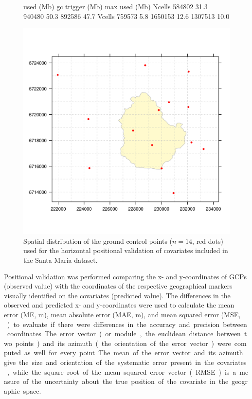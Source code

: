 \begin{figure}[!ht]
\centering
\begin{Schunk}
\begin{Soutput}
         used (Mb) gc trigger (Mb) max used (Mb)
Ncells 584802 31.3     940480 50.3   892586 47.7
Vcells 759573  5.8    1650153 12.6  1307513 10.0
\end{Soutput}
\end{Schunk}
\includegraphics{fig/chap05-field-gcps}
\caption[Ground control points used for the positional validation of the covariates.]{Spatial distribution of 
the ground control points ($n = 14$, red dots) used for the horizontal positional validation of covariates 
included in the Santa Maria dataset.}
\label{fig:chap05-field-gcps}
\end{figure}

Positional validation was performed comparing the x- and y-coordinates of GCPs (observed value) with the 
coordinates of the respective geographical markers visually identified on the covariates (predicted value). 
The differences in the observed and predicted x- and y-coordinates were used to calculate the mean error (ME, 
\si{\m}), mean absolute error (MAE, \si{\m}), and mean squared error (MSE, \si{\m\square}) to evaluate if 
there were differences in the accuracy and precision between coordinates. The error vector (or module, the 
euclidean distance between two points) and its azimuth (the orientation of the error vector) were computed as 
well for every point. The mean of the error vector and its azimuth give the size and orientation of the 
systematic error present in the covariates, while the square root of the mean squared error vector (RMSE) is a 
measure of the uncertainty about the true position of the covariate in the geographic space.

